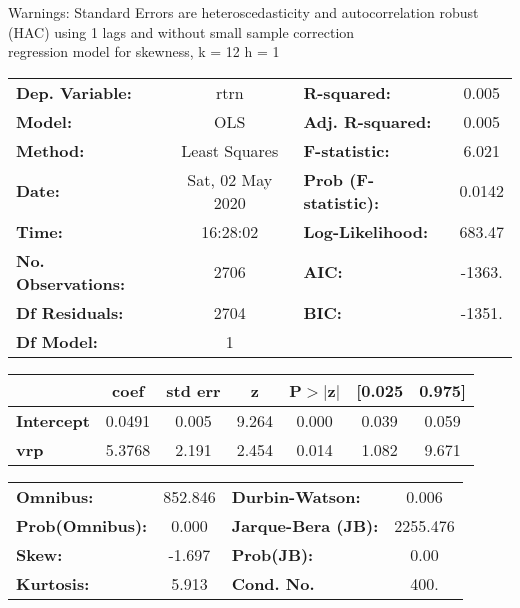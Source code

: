 Warnings: \newline
 [1] Standard Errors are heteroscedasticity and autocorrelation robust (HAC) using 1 lags and without small sample correction\\ 

regression model for skewness, k = 12 h = 1\begin{center}
\begin{tabular}{lclc}
\toprule
\textbf{Dep. Variable:}    &       rtrn       & \textbf{  R-squared:         } &     0.005   \\
\textbf{Model:}            &       OLS        & \textbf{  Adj. R-squared:    } &     0.005   \\
\textbf{Method:}           &  Least Squares   & \textbf{  F-statistic:       } &     6.021   \\
\textbf{Date:}             & Sat, 02 May 2020 & \textbf{  Prob (F-statistic):} &   0.0142    \\
\textbf{Time:}             &     16:28:02     & \textbf{  Log-Likelihood:    } &    683.47   \\
\textbf{No. Observations:} &        2706      & \textbf{  AIC:               } &    -1363.   \\
\textbf{Df Residuals:}     &        2704      & \textbf{  BIC:               } &    -1351.   \\
\textbf{Df Model:}         &           1      & \textbf{                     } &             \\
\bottomrule
\end{tabular}
\begin{tabular}{lcccccc}
                   & \textbf{coef} & \textbf{std err} & \textbf{z} & \textbf{P$> |$z$|$} & \textbf{[0.025} & \textbf{0.975]}  \\
\midrule
\textbf{Intercept} &       0.0491  &        0.005     &     9.264  &         0.000        &        0.039    &        0.059     \\
\textbf{vrp}       &       5.3768  &        2.191     &     2.454  &         0.014        &        1.082    &        9.671     \\
\bottomrule
\end{tabular}
\begin{tabular}{lclc}
\textbf{Omnibus:}       & 852.846 & \textbf{  Durbin-Watson:     } &    0.006  \\
\textbf{Prob(Omnibus):} &   0.000 & \textbf{  Jarque-Bera (JB):  } & 2255.476  \\
\textbf{Skew:}          &  -1.697 & \textbf{  Prob(JB):          } &     0.00  \\
\textbf{Kurtosis:}      &   5.913 & \textbf{  Cond. No.          } &     400.  \\
\bottomrule
\end{tabular}
\end{center}

